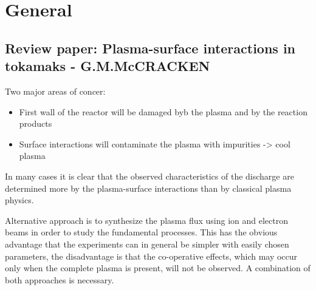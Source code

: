 \section{General}
\subsection{Review paper: Plasma-surface interactions in tokamaks - G.M.McCRACKEN}
Two major areas of concer: 
\begin{itemize}
    \item First wall of the reactor will be damaged byb the plasma and by the reaction products
    \item Surface interactions will contaminate the plasma with impurities -> cool plasma
\end{itemize}
In many cases it is clear that the observed characteristics of the discharge
are determined more by the plasma-surface interactions than by classical plasma
physics. 

Alternative approach is to synthesize the plasma flux using ion and electron beams in order to
study the fundamental processes. This has the obvious advantage that the experiments can in general be 
simpler with easily chosen parameters, the disadvantage is that the co-operative effects, which may occur only 
when the complete plasma is present, will not be observed. A combination of both approaches is necessary.

